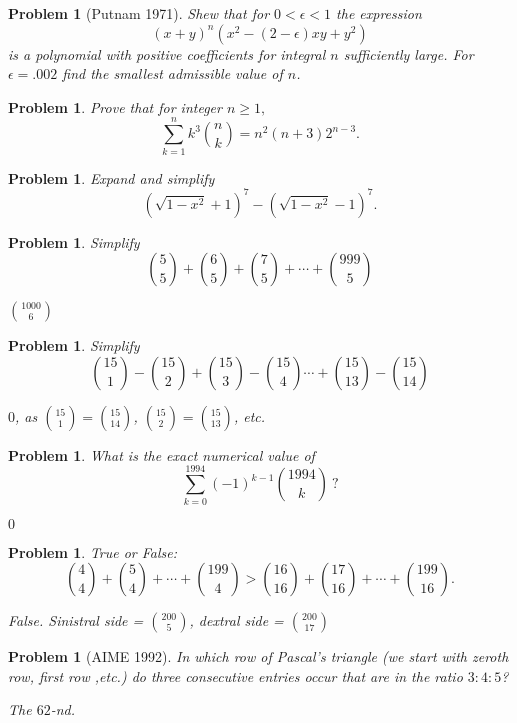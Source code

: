 \documentclass[11pt, openany]{book}
\theoremstyle{change} \theoremheaderfont{\blue\sffamily\bfseries}
\newtheorem{pro}[thm]{Problem}
\theoremstyle{nonumberplain} \theoremheaderfont{\sffamily\bfseries}
\def\binom#1#2{{#1\choose#2}}
\newcommand{\í}{\'{\i}}
\begin{document}
\begin{multicols}{2}
\begin{pro}[Putnam 1971] Shew that for $0 < \epsilon < 1$ the
expression $$ (x + y)^n(x^2 - (2 - \epsilon )xy + y^2)$$is a
polynomial with positive coefficients for integral $n$ sufficiently
large. For $\epsilon = .002$ find the smallest admissible value of
$n$. \end{pro}
\begin{pro} Prove that for integer $n \geq 1,$
$$ \sum _{k = 1} ^n k^3 \binom{n}{k} = n^2 (n + 3)2^{n - 3}.$$ \end{pro}
\begin{pro} Expand and simplify $$ (\sqrt{1 - x^2} + 1)^7 -
(\sqrt{1 - x^2} - 1)^7.$$\end{pro}
\begin{pro} Simplify$$\binom{5}{5} + \binom{6}{5} + \binom{7}{5} + \cdots +
\binom{999}{5}$$
\begin{answer} $\binom{1000}{6}   $ \end{answer}
\end{pro}
\begin{pro} Simplify$$ \binom{15}{1} - \binom{15}{2} + \binom{15}{3} - \binom{15}{4}
\cdots + \binom{15}{13} - \binom{15}{14}            $$
\begin{answer}
$0$, as $\binom{15}{1} = \binom{15}{14}$, $\binom{15}{2} =
\binom{15}{13}$, etc.
\end{answer}
\end{pro}
 \begin{pro} What is the exact numerical value
of
$$\sum _{k = 0} ^{1994} (-1)^{k - 1} \binom{1994}{k} \ ?$$
\begin{answer}
$0$
\end{answer}
\end{pro}
\begin{pro}True or False:
$$\binom{4}{4} + \binom{5}{4} + \cdots + \binom{199}{4} > \binom{16}{16} + \binom{17}{16} + \cdots + \binom{199}{16}.$$
\begin{answer} False. Sinistral side = $\binom{200}{5}$, dextral side =
$\binom{200}{17}$
\end{answer}
\end{pro}
\begin{pro}[AIME 1992] In which row of Pascal's triangle (we start
with zeroth row, first row ,etc.) do three consecutive entries
occur that are in the ratio $3:4:5$?
\begin{answer}
The $62$-nd.
\end{answer}
\end{pro}
\end{multicols}
\end{document}
